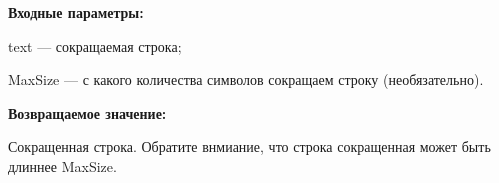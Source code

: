 \textbf{Входные параметры:}

text --- сокращаемая строка;
 
	MaxSize --- с какого количества символов сокращаем строку (необязательно).

\textbf{Возвращаемое значение:}

Сокращенная строка. Обратите внмиание, что строка сокращенная может быть длиннее MaxSize.